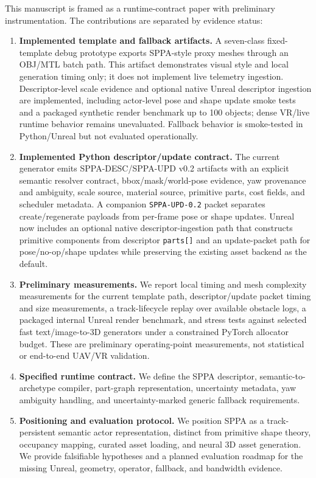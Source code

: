 ﻿\documentclass[11pt,a4paper]{article}
\begin{document}
This manuscript is framed as a runtime-contract paper with preliminary
instrumentation. The contributions are separated by evidence status:

\begin{enumerate}
    \item \textbf{Implemented template and fallback artifacts.} A seven-class fixed-template debug
    prototype exports SPPA-style proxy meshes through an OBJ/MTL batch path.
    This artifact demonstrates visual style and local generation timing only;
    it does not implement live telemetry ingestion. Descriptor-level scale
    evidence and optional native Unreal descriptor ingestion are implemented,
    including actor-level pose and shape update smoke tests and a packaged
    synthetic render benchmark up to 100 objects; dense VR/live runtime behavior
    remains unevaluated. Fallback behavior is smoke-tested in
    Python/Unreal but not evaluated operationally.
    \item \textbf{Implemented Python descriptor/update contract.} The current
    generator emits SPPA-DESC/SPPA-UPD v0.2 artifacts with an explicit semantic
    resolver contract, bbox/mask/world-pose evidence, yaw provenance and
    ambiguity, scale source, material source, primitive parts, cost fields, and
    scheduler metadata. A
    companion \texttt{SPPA-UPD-0.2} packet separates create/regenerate payloads
    from per-frame pose or shape updates. Unreal now includes an optional
    native descriptor-ingestion path that constructs primitive components from
    descriptor \texttt{parts[]} and an update-packet path for
    pose/no-op/shape updates while preserving the existing asset backend as the
    default.
    \item \textbf{Preliminary measurements.} We report local timing and mesh
    complexity measurements for the current template path, descriptor/update
    packet timing and size measurements, a track-lifecycle replay over
    available obstacle logs, a packaged internal Unreal render benchmark, and
    stress tests against selected fast text/image-to-3D generators under a
    constrained PyTorch allocator budget. These are preliminary operating-point
    measurements, not statistical or end-to-end UAV/VR validation.
    \item \textbf{Specified runtime contract.} We define the SPPA descriptor,
    semantic-to-archetype compiler, part-graph representation, uncertainty
    metadata, yaw ambiguity handling, and uncertainty-marked generic fallback
    requirements.
    \item \textbf{Positioning and evaluation protocol.} We position SPPA as a
    track-persistent semantic actor representation, distinct from primitive
    shape theory, occupancy mapping, curated asset loading, and neural 3D asset
    generation. We provide falsifiable hypotheses and a planned evaluation
    roadmap for the missing Unreal, geometry, operator, fallback, and bandwidth
    evidence.
\end{enumerate}
\end{document}
